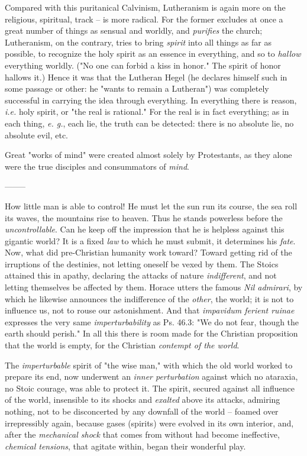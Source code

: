 \documentclass[a4paper]{book}
\begin{document}
Compared with this puritanical Calvinism, Lutheranism is again more on the 
religious, spiritual, track -- is more radical. For the former excludes at 
once a great number of things as sensual and worldly, and \textit{purifies} 
the church; Lutheranism, on the contrary, tries to bring \textit{spirit} into 
all things as far as possible, to recognize the holy spirit as an essence in 
everything, and so to \textit{hallow} everything worldly. ("{}No one can 
forbid a kiss in honor."{} The spirit of honor hallows it.) Hence it was that 
the Lutheran Hegel (he declares himself such in some passage or other: he 
"{}wants to remain a Lutheran"{}) was completely successful in carrying the 
idea through everything. In everything there is reason, \textit{i.e.} holy 
spirit, or "{}the real is rational."{} For the real is in fact everything; as 
in each thing, \textit{e. g.}, each lie, the truth can be detected: there is 
no absolute lie, no absolute evil, etc.

Great "{}works of mind"{} were created almost solely by Protestants, as they 
alone were the true disciples and consummators of \textit{mind}.

\begin{center}
--------\end{center}


How little man is able to control! He must let the sun run its course, the sea 
roll its waves, the mountains rise to heaven. Thus he stands powerless before 
the \textit{uncontrollable}. Can he keep off the impression that he is 
helpless against this gigantic world? It is a fixed \textit{law} to which he 
must submit, it determines his \textit{fate}. Now, what did pre-Christian 
humanity work toward? Toward getting rid of the irruptions of the destinies, 
not letting oneself be vexed by them. The Stoics attained this in apathy, 
declaring the attacks of nature \textit{indifferent}, and not letting 
themselves be affected by them. Horace utters the famous \textit{Nil 
admirari}, by which he likewise announces the indifference of the 
\textit{other}, the world; it is not to influence us, not to rouse our 
astonishment. And that \textit{impavidum ferient ruinae} expresses the very 
same \textit{imperturbability} as Ps. 46.3: "{}We do not fear, though the 
earth should perish."{} In all this there is room made for the Christian 
proposition that the world is empty, for the Christian \textit{contempt of the 
world}.

The \textit{imperturbable} spirit of "{}the wise man,"{} with which the old 
world worked to prepare its end, now underwent an \textit{inner perturbation} 
against which no ataraxia, no Stoic courage, was able to protect it. The 
spirit, secured against all influence of the world, insensible to its shocks 
and \textit{exalted} above its attacks, admiring nothing, not to be 
disconcerted by any downfall of the world -- foamed over irrepressibly again, 
because gases (spirits) were evolved in its own interior, and, after the 
\textit{mechanical shock} that comes from without had become ineffective, 
\textit{chemical tensions}, that agitate within, began their wonderful play.
\end{document}
